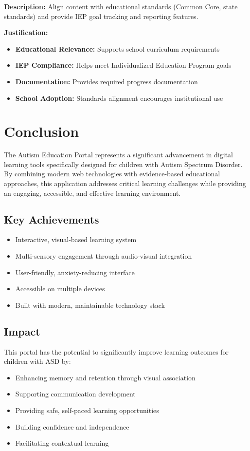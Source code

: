 \documentclass[12pt,a4paper]{article}
\begin{document}
\begin{itemize}
\textbf{Description:}
Align content with educational standards (Common Core, state standards) and provide IEP goal tracking and reporting features.

\textbf{Justification:}
\begin{itemize}
    \item \textbf{Educational Relevance:} Supports school curriculum requirements
    \item \textbf{IEP Compliance:} Helps meet Individualized Education Program goals
    \item \textbf{Documentation:} Provides required progress documentation
    \item \textbf{School Adoption:} Standards alignment encourages institutional use
\end{itemize}

\newpage
\section{Conclusion}

The Autism Education Portal represents a significant advancement in digital learning tools specifically designed for children with Autism Spectrum Disorder. By combining modern web technologies with evidence-based educational approaches, this application addresses critical learning challenges while providing an engaging, accessible, and effective learning environment.

\subsection{Key Achievements}
\begin{itemize}
    \item Interactive, visual-based learning system
    \item Multi-sensory engagement through audio-visual integration
    \item User-friendly, anxiety-reducing interface
    \item Accessible on multiple devices
    \item Built with modern, maintainable technology stack
\end{itemize}

\subsection{Impact}
This portal has the potential to significantly improve learning outcomes for children with ASD by:
\begin{itemize}
    \item Enhancing memory and retention through visual association
    \item Supporting communication development
    \item Providing safe, self-paced learning opportunities
    \item Building confidence and independence
    \item Facilitating contextual learning
\end{itemize}


\end{itemize}
\end{document}
